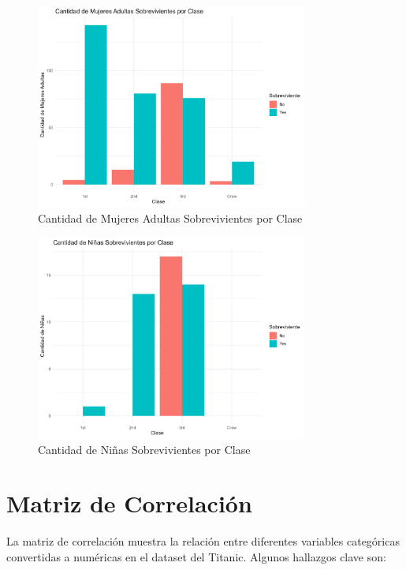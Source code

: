 \documentclass{article}
\begin{document}

\begin{figure}[H]
    \centering
    \includegraphics[width=0.8\textwidth]{mujeres_adultas_sobrevivientes_por_clase.png}
    \caption{Cantidad de Mujeres Adultas Sobrevivientes por Clase}
    \label{fig:mujeres_adultas_sobrevivientes_por_clase}
\end{figure}


\begin{figure}[H]
    \centering
    \includegraphics[width=0.8\textwidth]{ninas_sobrevivientes_por_clase.png}
    \caption{Cantidad de Niñas Sobrevivientes por Clase}
    \label{fig:ninas_sobrevivientes_por_clase}
\end{figure}

\section{Matriz de Correlación}
La matriz de correlación muestra la relación entre diferentes variables categóricas convertidas a numéricas en el dataset del Titanic. Algunos hallazgos clave son:
\end{document}
